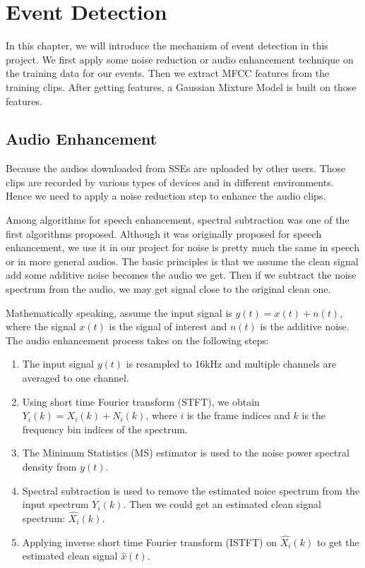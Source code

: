 
\chapter{Event Detection}
In this chapter, we will introduce the mechanism of event detection in this project. 
We first apply some noise reduction or audio enhancement technique on the training data for our events. 
Then we extract MFCC features from the training clips. 
After getting features, a Gaussian Mixture Model is built on those features. 

\section{Audio Enhancement}
Because the audios downloaded from SSEs are uploaded by other users. 
Those clips are recorded by various types of devices and in different environments. 
Hence we need to apply a noise reduction step to enhance the audio clips. 

Among algorithms for speech enhancement, spectral subtraction was one of the first algorithms proposed. 
Although it was originally proposed for speech enhancement, we use it in our project for noise is pretty much the same in speech or in more general audios. 
The basic principles is that we assume the clean signal add some additive noise becomes the audio we get. 
Then if we subtract the noise spectrum from the audio, we may get signal close to the original clean one. 

Mathematically speaking, assume the input signal is $ y(t) = x(t) + n(t)$, where the signal $x(t)$ is the signal of interest and $n(t)$ is the additive noise. 
The audio enhancement process takes on the following steps:
\begin{enumerate}
\item The input signal $y(t)$ is resampled to 16kHz and multiple channels are averaged to one channel. 
\item Using short time Fourier transform (STFT), we obtain $Y_i(k) = X_i(k) + N_i(k)$, where $i$ is the frame indices and $k$ is the frequency bin indices of the spectrum. 
\item The Minimum Statistics (MS) estimator \cite{martin2001noise} is used to the noise power spectral density from $y(t)$. 
\item Spectral subtraction is used to remove the estimated noice spectrum from the input spectrum $Y_i(k)$. 
Then we could get an estimated clean signal spectrum: $\hat{X_i}(k)$. 
\item Applying inverse short time Fourier transform (ISTFT) on $\hat{X_i}(k)$ to get the estimated clean signal $\hat{x}(t)$. 
\end{enumerate}

